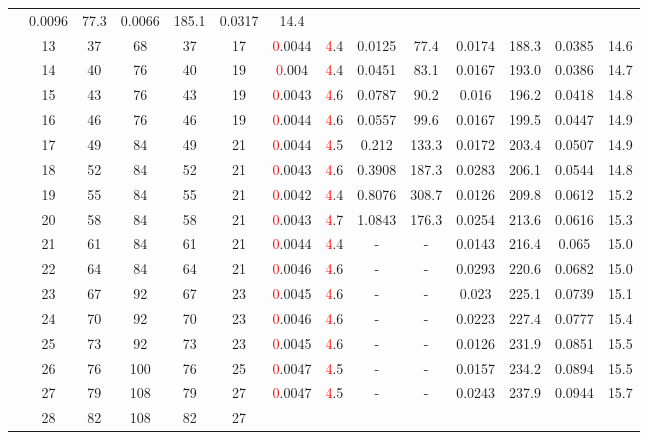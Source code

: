 \begin{table}[htb]
{\begin{tabular}{|c|c|c|c|c|c|c|c|c|c|c|c|c|c|}
 & 0.0096 & 77.3
 & 0.0066 & 185.1
 & 0.0317 & 14.4
 \\
 & 
13 & 37 & 68 & 37 & 17
 & \textcolor{red}0.0044 & \textcolor{red}4.4
 & 0.0125 & 77.4
 & 0.0174 & 188.3
 & 0.0385 & 14.6
 \\
 & 
14 & 40 & 76 & 40 & 19
 & \textcolor{red}0.004 & \textcolor{red}4.4
 & 0.0451 & 83.1
 & 0.0167 & 193.0
 & 0.0386 & 14.7
 \\
 & 
15 & 43 & 76 & 43 & 19
 & \textcolor{red}0.0043 & \textcolor{red}4.6
 & 0.0787 & 90.2
 & 0.016 & 196.2
 & 0.0418 & 14.8
 \\
 & 
16 & 46 & 76 & 46 & 19
 & \textcolor{red}0.0044 & \textcolor{red}4.6
 & 0.0557 & 99.6
 & 0.0167 & 199.5
 & 0.0447 & 14.9
 \\
 & 
17 & 49 & 84 & 49 & 21
 & \textcolor{red}0.0044 & \textcolor{red}4.5
 & 0.212 & 133.3
 & 0.0172 & 203.4
 & 0.0507 & 14.9
 \\
 & 
18 & 52 & 84 & 52 & 21
 & \textcolor{red}0.0043 & \textcolor{red}4.6
 & 0.3908 & 187.3
 & 0.0283 & 206.1
 & 0.0544 & 14.8
 \\
 & 
19 & 55 & 84 & 55 & 21
 & \textcolor{red}0.0042 & \textcolor{red}4.4
 & 0.8076 & 308.7
 & 0.0126 & 209.8
 & 0.0612 & 15.2
 \\
 & 
20 & 58 & 84 & 58 & 21
 & \textcolor{red}0.0043 & \textcolor{red}4.7
 & 1.0843 & 176.3
 & 0.0254 & 213.6
 & 0.0616 & 15.3
 \\
 & 
21 & 61 & 84 & 61 & 21
 & \textcolor{red}0.0044 & \textcolor{red}4.4
 & - & -
 & 0.0143 & 216.4
 & 0.065 & 15.0
 \\
 & 
22 & 64 & 84 & 64 & 21
 & \textcolor{red}0.0046 & \textcolor{red}4.6
 & - & -
 & 0.0293 & 220.6
 & 0.0682 & 15.0
 \\
 & 
23 & 67 & 92 & 67 & 23
 & \textcolor{red}0.0045 & \textcolor{red}4.6
 & - & -
 & 0.023 & 225.1
 & 0.0739 & 15.1
 \\
 & 
24 & 70 & 92 & 70 & 23
 & \textcolor{red}0.0046 & \textcolor{red}4.6
 & - & -
 & 0.0223 & 227.4
 & 0.0777 & 15.4
 \\
 & 
25 & 73 & 92 & 73 & 23
 & \textcolor{red}0.0045 & \textcolor{red}4.6
 & - & -
 & 0.0126 & 231.9
 & 0.0851 & 15.5
 \\
 & 
26 & 76 & 100 & 76 & 25
 & \textcolor{red}0.0047 & \textcolor{red}4.5
 & - & -
 & 0.0157 & 234.2
 & 0.0894 & 15.5
 \\
 & 
27 & 79 & 108 & 79 & 27
 & \textcolor{red}0.0047 & \textcolor{red}4.5
 & - & -
 & 0.0243 & 237.9
 & 0.0944 & 15.7
 \\
 & 
28 & 82 & 108 & 82 & 27

\end{tabular}}
\end{table}
